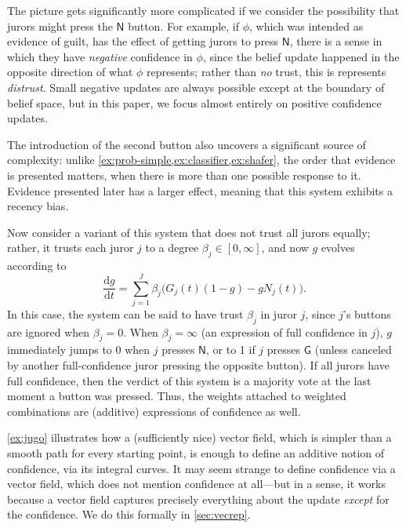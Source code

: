 \begin{example}
The picture gets significantly more complicated if we consider the possibility
that jurors might press the $\mathsf N$ button. For example, if $\phi$, which was intended
as evidence of guilt, has the effect of getting jurors to press $\mathsf N$, there is a sense
in which they have \emph{negative} confidence in $\phi$, since the belief update happened in the opposite direction of what $\phi$ represents; rather than \emph{no} trust, this is represents \emph{distrust}. 
Small negative updates are always possible except at the boundary of belief space, but in this paper, we focus almost entirely on positive confidence updates.

The introduction of the second button also uncovers a significant source of complexity:
unlike \cref{ex:prob-simple,ex:classifier,ex:shafer}, 
the order that evidence is presented matters, when there is more than one possible response to it.
Evidence presented later has a larger effect,
meaning that this system exhibits a recency bias.

Now consider a variant of this system that does
not trust all jurors equally; rather, it trusts each juror $j$
to a degree $\beta_j \in [0, \infty]$, and now $g$ evolves
according to
\[
	\frac{\mathrm dg}{\mathrm dt} = 
	\sum_{j = 1}^J \beta_j \Big( G_j(t) (1-g) 
		- g N_j(t) \Big).
\]
In this case, the system can be said to have trust $\beta_j$ in juror
$j$, since $j$'s buttons are ignored when $\beta_j = 0$. 
When $\beta_j = \infty$ (an expression of full confidence in $j$),
$g$ immediately jumps to 0 when $j$ presses 
$\mathsf N$, or to 1 if $j$ presses $\mathsf G$ (unless canceled by
another full-confidence juror pressing the opposite button).
If all jurors have full confidence, then the verdict of this system is
a majority vote at the last moment a button was pressed. 
Thus, the weights attached to weighted combinations are (additive) expressions 
of confidence as well. 
\end{example}

\cref{ex:jugo} illustrates how a (sufficiently nice) vector field, 
	which is simpler than a smooth path for every starting point, is enough to define
an additive notion of confidence, via its integral curves.
It may seem strange to define confidence via a vector field, which does not mention confidence at all---but in a sense, it works because a vector field captures precisely everything about the update \emph{except} for the confidence. We do this formally in \cref{sec:vecrep}. 


